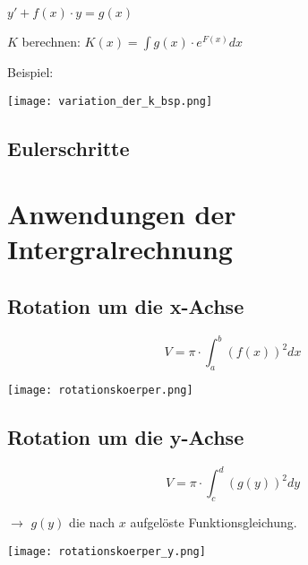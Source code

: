 \begin{multicols*}{3}
    {       $y' + f(x) \cdot y = g(x)$}



     {$K$ berechnen: \large $K(x) = \int g(x) \cdot e^{F(x)} dx $}





    {Beispiel:}

    \texttt{[image: variation\_der\_k\_bsp.png]}




    \subsection{ Eulerschritte}

    \vfill\null
    \columnbreak
    \vfill\null
    \columnbreak

    \section{Anwendungen der Intergralrechnung}
    \subsection{Rotation um die x-Achse}

    \begin{multicols}{2}

        {$$V = \pi \cdot \int_{a}^{b}(f(x))^2dx$$}

        \columnbreak
        \texttt{[image: rotationskoerper.png]}
    \end{multicols}


    \subsection{Rotation um die y-Achse}

    \begin{multicols}{2}

        {$$V = \pi \cdot \int_{c}^{d}(g(y))^2dy$$}

        $\rightarrow$ $g(y)$ die nach $x$ aufgelöste Funktionsgleichung.

        \columnbreak
        \texttt{[image: rotationskoerper\_y.png]}
    \end{multicols}




\end{multicols*}
